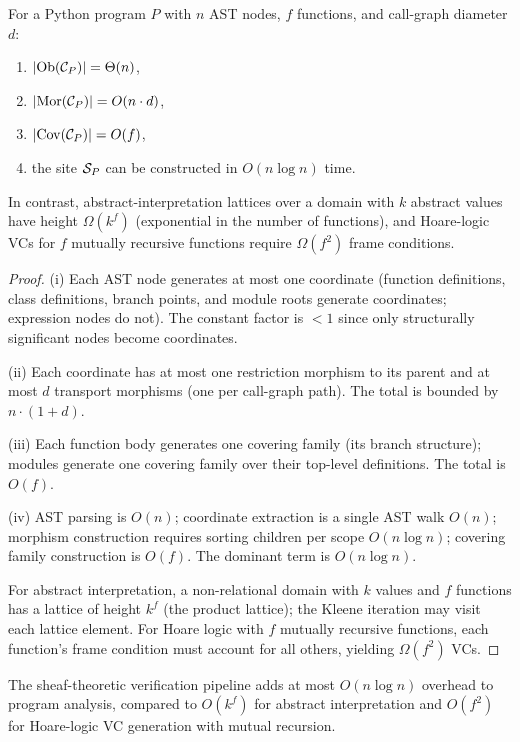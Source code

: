 \documentclass[11pt]{article}
\begin{document}
\begin{theorem}\label{thm:complexity}
For a Python program $P$ with $n$ AST nodes, $f$ functions, and
call-graph diameter $d$:
\begin{enumerate}[label=(\roman*),nosep]
  \item $|\mathrm{Ob}(\mathcal{C}_P)| = \Theta(n)$,
  \item $|\mathrm{Mor}(\mathcal{C}_P)| = O(n \cdot d)$,
  \item $|\mathrm{Cov}(\mathcal{C}_P)| = O(f)$,
  \item the site $\mathcal{S}_P$ can be constructed in $O(n \log n)$ time.
\end{enumerate}
In contrast, abstract-interpretation lattices over a domain with $k$
abstract values have height $\Omega(k^f)$ (exponential in the number
of functions), and Hoare-logic VCs for $f$ mutually recursive functions
require $\Omega(f^2)$ frame conditions.
\end{theorem}

\begin{proof}
(i) Each AST node generates at most one coordinate (function definitions,
class definitions, branch points, and module roots generate coordinates;
expression nodes do not).  The constant factor is $< 1$ since only
structurally significant nodes become coordinates.

(ii) Each coordinate has at most one restriction morphism to its parent
and at most $d$ transport morphisms (one per call-graph path).  The total
is bounded by $n \cdot (1 + d)$.

(iii) Each function body generates one covering family (its branch
structure); modules generate one covering family over their top-level
definitions.  The total is $O(f)$.

(iv) AST parsing is $O(n)$; coordinate extraction is a single AST walk
$O(n)$; morphism construction requires sorting children per scope
$O(n \log n)$; covering family construction is $O(f)$.  The dominant
term is $O(n \log n)$.

For abstract interpretation, a non-relational domain with $k$ values
and $f$ functions has a lattice of height $k^f$ (the product lattice);
the Kleene iteration may visit each lattice element.  For Hoare logic
with $f$ mutually recursive functions, each function's frame condition
must account for all others, yielding $\Omega(f^2)$ VCs.
\end{proof}

\begin{corollary}
The sheaf-theoretic verification pipeline adds at most $O(n \log n)$
overhead to program analysis, compared to $O(k^f)$ for abstract
interpretation and $O(f^2)$ for Hoare-logic VC generation with mutual
recursion.
\end{corollary}
\end{document}
